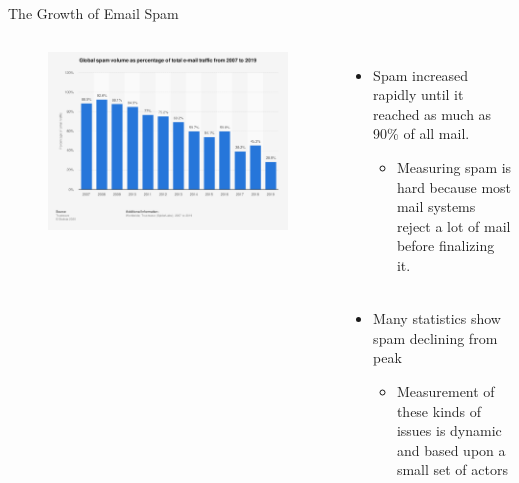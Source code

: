\documentclass[nobackground,dvipsnames,table]{beamer}
\begin{document}
\begin{frame}{The Growth of Email Spam}
    \begin{columns}
            \begin{figure}
                \centering
                \includegraphics[width=\textwidth]{spam-percent}
            \end{figure}
            \begin{itemize}
                \item Spam increased rapidly until it reached as much as 90\% of all mail.
                \begin{itemize}
                    \item Measuring spam is hard because most mail systems reject a lot of mail before finalizing it. \\~\\
                \end{itemize}
                
                \item Many statistics show spam declining from peak
                \begin{itemize}
                    \item Measurement of these kinds of issues is dynamic and based upon a small set of actors
                \end{itemize}
            \end{itemize}
    \end{columns}
\end{frame}
\end{document}
